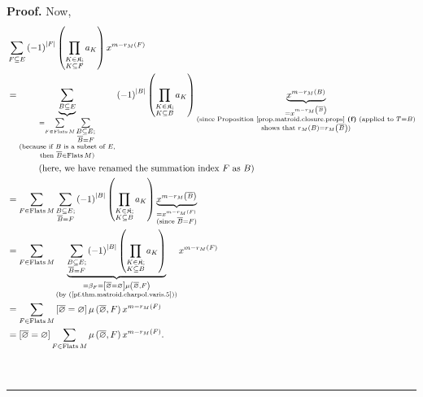 \documentclass[numbers=enddot,12pt,final,onecolumn,notitlepage]{scrartcl}%
\theoremstyle{definition}
\newenvironment{proof}[1][Proof]{\noindent\textbf{#1.} }{\ \rule{0.5em}{0.5em}}
\let\sumnonlimits\sum
\let\prodnonlimits\prod
\renewcommand{\sum}{\sumnonlimits\limits}
\renewcommand{\prod}{\prodnonlimits\limits}
\begin{document}
\begin{proof}
Now,%
\begin{align}
&  \sum_{F\subseteq E}\left(  -1\right)  ^{\left\vert F\right\vert }\left(
\prod_{\substack{K\in\mathfrak{K};\\K\subseteq F}}a_{K}\right)  x^{m-r_{M}%
\left(  F\right)  }\nonumber\\
&  =\underbrace{\sum_{B\subseteq E}}_{\substack{=\sum_{F\in
\operatorname*{Flats}M}\sum_{\substack{B\subseteq E;\\\overline{B}%
=F}}\\\text{(because if }B\text{ is a subset of }E\text{,}\\\text{then
}\overline{B}\in\operatorname*{Flats}M\text{)}}}\left(  -1\right)
^{\left\vert B\right\vert }\left(  \prod_{\substack{K\in\mathfrak{K}%
;\\K\subseteq B}}a_{K}\right)  \underbrace{x^{m-r_{M}\left(  B\right)  }%
}_{\substack{=x^{m-r_{M}\left(  \overline{B}\right)  }\\\text{(since
Proposition \ref{prop.matroid.closure.props} \textbf{(f)} (applied to
}T=B\text{)}\\\text{shows that }r_{M}\left(  B\right)  =r_{M}\left(
\overline{B}\right)  \text{)}}}\nonumber\\
&  \ \ \ \ \ \ \ \ \ \ \left(  \text{here, we have renamed the summation index
}F\text{ as }B\right) \nonumber\\
&  =\sum_{F\in\operatorname*{Flats}M}\sum_{\substack{B\subseteq E;\\\overline
{B}=F}}\left(  -1\right)  ^{\left\vert B\right\vert }\left(  \prod
_{\substack{K\in\mathfrak{K};\\K\subseteq B}}a_{K}\right)
\underbrace{x^{m-r_{M}\left(  \overline{B}\right)  }}%
_{\substack{_{\substack{=x^{m-r_{M}\left(  F\right)  }}}\\\text{(since
}\overline{B}=F\text{)}}}\nonumber\\
&  =\sum_{F\in\operatorname*{Flats}M}\underbrace{\sum_{\substack{B\subseteq
E;\\\overline{B}=F}}\left(  -1\right)  ^{\left\vert B\right\vert }\left(
\prod_{\substack{K\in\mathfrak{K};\\K\subseteq B}}a_{K}\right)  }%
_{\substack{=\beta_{F}=\left[  \overline{\varnothing}=\varnothing\right]
\mu\left(  \overline{\varnothing},F\right)  \\\text{(by
(\ref{pf.thm.matroid.charpol.varis.5}))}}}x^{m-r_{M}\left(  F\right)
}\nonumber\\
&  =\sum_{F\in\operatorname*{Flats}M}\left[  \overline{\varnothing
}=\varnothing\right]  \mu\left(  \overline{\varnothing},F\right)
x^{m-r_{M}\left(  F\right)  }\nonumber\\
&  =\left[  \overline{\varnothing}=\varnothing\right]  \sum_{F\in
\operatorname*{Flats}M}\mu\left(  \overline{\varnothing},F\right)
x^{m-r_{M}\left(  F\right)  }. \label{pf.thm.matroid.charpol.varis.9}%
\end{align}



\end{proof}
\end{document}
